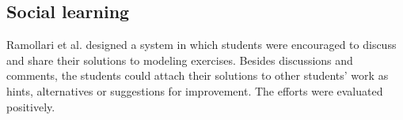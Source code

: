 \subsection{Social learning}

Ramollari et al.\cite{trapp2011collaborative} designed a system in which students were encouraged to discuss and share their solutions to modeling exercises. Besides discussions and comments, the students could attach their solutions to other students' work as hints, alternatives or suggestions for improvement. The efforts were evaluated positively.



